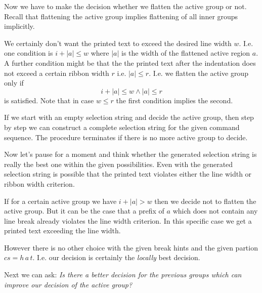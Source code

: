 \documentclass[12pt]{article}
\begin{document}
Now we have to make the decision whether we flatten the active group or
not. Recall that flattening the active group implies flattening of all inner
groups implicitly.

We certainly don't want the printed text to exceed the desired line width
$w$. I.e. one condition is $i + |a| \le w$ where $|a|$ is the width of the
flattened active region $a$. A further condition might be that the the printed
text after the indentation does not exceed a certain ribbon width $r$
i.e. $|a| \le r$. I.e. we flatten the active group only if
$$
i + |a| \le w \land |a| \le r
$$
is satisfied. Note that in case $w \le r$ the first condition implies the
second.

If we start with an empty selection string and decide the active group, then
step by step we can construct a complete selection string for the given
command sequence. The procedure terminates if there is no more active group to
decide.

Now let's pause for a moment and think whether the generated selection string
is really the best one within the given possibilities. Even with the generated
selection string is possible that the printed text violates either the line
width or ribbon width criterion.

If for a certain active group we have $i + |a| > w$ then we decide not to
flatten the active group. But it can be the case that a prefix of $a$ which
does not contain any line break already violates the line width criterion. In
this specific case we get a printed text exceeding the line width.

However there is no other choice with the given break hints and the given
partion $cs = h \, a \, t$. I.e. our decision is certainly the \emph{locally}
best decision.

Next we can ask: \emph{Is there a better decision for the previous groups
  which can improve our decision of the active group?}
\end{document}
